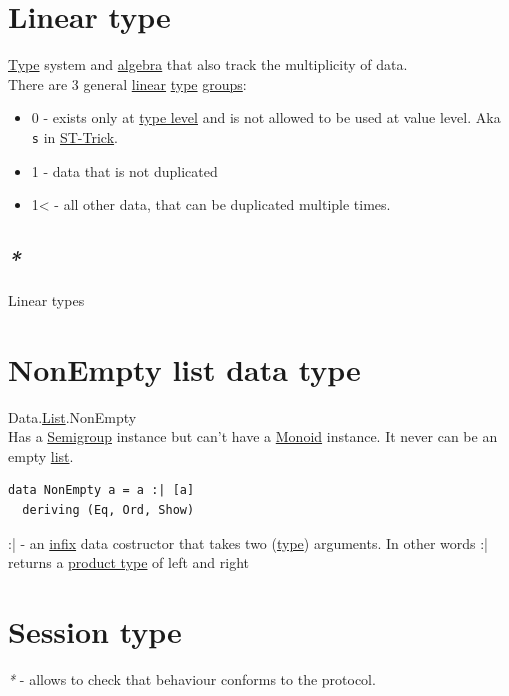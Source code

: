 \documentclass[a4paper,14pt,oneside]{book}
\begin{document}
\section{\label{org530c008}Linear type}
\label{sec:org2fef864}
\hyperref[orgb064f4e]{Type} system and \hyperref[org7783989]{algebra} that also track the multiplicity of data.\\
There are 3 general \hyperref[orgf12dd79]{linear} \hyperref[orgb064f4e]{type} \hyperref[org615ae87]{groups}:\\
\begin{itemize}
\item 0 - exists only at \hyperref[org4ba9292]{type level} and is not allowed to be used at value level. Aka \texttt{s} in \hyperref[org576ace6]{ST-Trick}.\\
\item 1 - data that is not duplicated\\
\item 1< - all other data, that can be duplicated multiple times.\\
\end{itemize}

\subsection{\emph{*}}
\label{sec:org813180f}

\label{org4935320}Linear types\\

\section{\label{orga5c924f}NonEmpty list data type}
\label{sec:org35d83ae}
Data.\hyperref[orgcb490bc]{List}.NonEmpty\\
Has a \hyperref[orgf4c815a]{Semigroup} instance but can't have a \hyperref[org3c86258]{Monoid} instance. It never can be an empty \hyperref[orgcb490bc]{list}.\\

\begin{verbatim}
data NonEmpty a = a :| [a]
  deriving (Eq, Ord, Show)
\end{verbatim}

:| - an \hyperref[org7eff386]{infix} data costructor that takes two (\hyperref[orgb064f4e]{type}) arguments. In other words :| returns a \hyperref[orgc397eb9]{product type} of left and right\\

\section{\label{org2e2b5e4}Session type}
\label{sec:org10fc82c}
\emph{*} - allows to check that behaviour conforms to the protocol.\\
\end{document}
